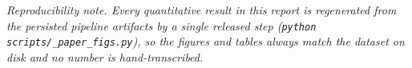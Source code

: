 \documentclass[11pt,a4paper]{report}
\newcommand{\code}[1]{\texttt{\small #1}}
\begin{document}
\medskip
\noindent\textit{\small Reproducibility note. Every quantitative result in this report is
regenerated from the persisted pipeline artifacts by a single released step
(\code{python scripts/\_paper\_figs.py}), so the figures and tables always match the
dataset on disk and no number is hand-transcribed.}

\tableofcontents
\listoftables








\cleardoublepage
{}

\end{document}
